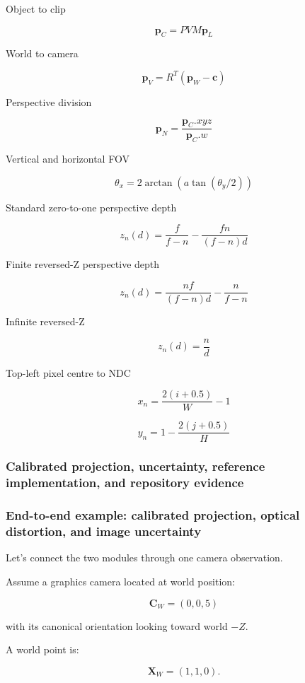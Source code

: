 Object to clip

\[
 \boxed{ \mathbf p_C=PVM\mathbf p_L }
\]

World to camera

\[
 \boxed{ \mathbf p_V=R^T(\mathbf p_W-\mathbf c) }
\]

Perspective division

\[
 \boxed{ \mathbf p_N= \frac{\mathbf p_C.xyz}{\mathbf p_C.w} }
\]

Vertical and horizontal FOV

\[
 \boxed{ \theta_x= 2\arctan \left( a\tan(\theta_y/2) \right) }
\]

Standard zero-to-one perspective depth

\[
 \boxed{ z_n(d)= \frac f{f-n} - \frac{fn}{(f-n)d} }
\]

Finite reversed-Z perspective depth

\[
 \boxed{ z_n(d)= \frac{nf}{(f-n)d} - \frac n{f-n} }
\]

Infinite reversed-Z

\[
 \boxed{ z_n(d)=\frac nd }
\]

Top-left pixel centre to NDC

\[
 \boxed{ x_n=\frac{2(i+0.5)}W-1 }
\]

\[
 \boxed{ y_n=1-\frac{2(j+0.5)}H }
\]

\subsubsection{Calibrated projection, uncertainty, reference implementation, and repository evidence}\label{calibrated-projection-uncertainty-reference-implementation-and-repository-evidence}

\subsubsection{End-to-end example: calibrated projection, optical distortion, and image uncertainty}\label{end-to-end-example-calibrated-projection-optical-distortion-and-image-uncertainty}

Let's connect the two modules through one camera observation.

Assume a graphics camera located at world position:

\[
 \mathbf C_W=(0,0,5)
\]

with its canonical orientation looking toward world \(-Z\).

A world point is:

\[
 \mathbf X_W=(1,1,0).
\]

